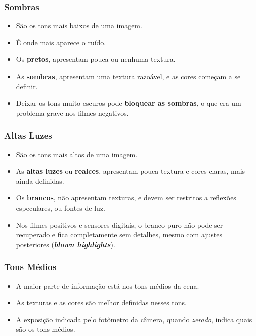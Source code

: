 \begin{frame}
    \frametitle{Sombras}
    \begin{itemize}
      \item São os tons mais baixos de uma imagem.
      \item É onde mais aparece o ruído.
      \item Os \textbf{pretos}, apresentam pouca ou nenhuma textura.
      \item As \textbf{sombras}, apresentam uma textura razoável, e as cores
      começam a se definir.
      \item Deixar os tons muito escuros pode \textbf{bloquear as sombras}, o que era
      um problema grave nos filmes negativos.
    \end{itemize}
\end{frame}

\begin{frame}
    \frametitle{Altas Luzes}
    \begin{itemize}
      \item São os tons mais altos de uma imagem.
      \item As \textbf{altas luzes} ou \textbf{realces}, apresentam pouca textura e cores
      claras, mais ainda definidas.
      \item Os \textbf{brancos}, não apresentam texturas, e devem ser restritos a
      reflexões especulares, ou fontes de luz.
      \item Nos filmes positivos e sensores digitais, o branco puro não pode ser
      recuperado e fica completamente sem detalhes, mesmo com ajustes posteriores
      (\textbf{\textit{blown highlights}}).
    \end{itemize}
\end{frame}


\begin{frame}
    \frametitle{Tons Médios}
    \begin{itemize}
      \item A maior parte de informação está nos tons médios da cena.
      \item As texturas e as cores são melhor definidas nesses tons.
      \item A exposição indicada pelo fotômetro da câmera, quando \textit{zerado},
      indica quais são os tons médios.
    \end{itemize}
\end{frame}

